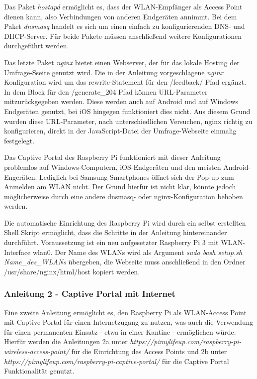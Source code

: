 Das Paket \textit{hostapd} ermöglicht es, dass der WLAN-Empfänger als Access Point dienen kann, also Verbindungen von anderen Endgeräten annimmt. Bei dem Paket \textit{dnsmasq} handelt es sich um einen einfach zu konfigurierenden DNS- und DHCP-Server. Für beide Pakete müssen anschließend weitere Konfigurationen durchgeführt werden.

Das letzte Paket \textit{nginx} bietet einen Webserver, der für das lokale Hosting der Umfrage-Sseite genutzt wird. Die in der Anleitung vorgeschlagene \textit{nginx} Konfiguration wird um das rewrite-Statement für den /feedback/ Pfad ergänzt. In dem Block für den /generate\_204 Pfad können URL-Parameter mitzurückgegeben werden. Diese werden auch auf Android und auf Windows Endgeräten genutzt, bei iOS hingegen funktioniert dies nicht. Aus diesem Grund wurden diese URL-Parameter, nach unterschiedlichen Versuchen, nginx richtig zu konfigurieren, direkt in der JavaScript-Datei der Umfrage-Webseite einmalig festgelegt.

Das Captive Portal des Raspberry Pi funktioniert mit dieser Anleitung problemlos auf Windows-Computern, iOS-Endgeräten und den meisten Android-Engeräten. Lediglich bei Samsung-Smartphones öffnet sich der Pop-up zum Anmelden am WLAN nicht. Der Grund hierfür ist nicht klar, könnte jedoch möglicherweise durch eine andere dnsmasq- oder nginx-Konfiguration behoben werden.

Die automatische Einrichtung des Raspberry Pi wird durch ein selbst erstellten Shell Skript ermöglicht, dass die Schritte in der Anleitung hintereinander durchführt. Voraussetzung ist ein neu aufgesetzter Raspberry Pi 3 mit WLAN-Interface wlan0. Der Name des WLANs wird als Argument \textit{sudo bash setup.sh Name\_des\_WLANs} übergeben, die Webseite muss anschließend in den Ordner /usr/share/nginx/html/host kopiert werden.

\subsubsection*{Anleitung 2 - Captive Portal mit Internet}
Eine zweite Anleitung ermöglicht es, den Raspberry Pi als WLAN-Access Point mit Captive Portal für einen Internetzugang zu nutzen, was auch die Verwendung für einen permanenten Einsatz - etwa in einer Kantine - ermöglichen würde. Hierfür werden die Anleitungen 2a unter \textit{https://pimylifeup.com/raspberry-pi-wireless-access-point/} für die Einrichtung des Access Points und 2b unter \textit{https://pimylifeup.com/raspberry-pi-captive-portal/} für die Captive Portal Funktionalität genutzt.

